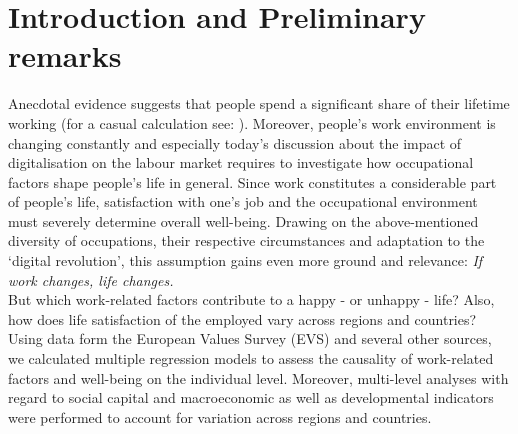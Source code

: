 \documentclass[preprint,12pt,authoryear]{elsarticle}
\begin{document}
\section{Introduction and Preliminary remarks}
Anecdotal evidence suggests that people spend a significant share of their lifetime working (for a casual calculation 
see: \citet{thompson_what_2016}). Moreover, people's work environment is changing constantly and especially today's 
discussion about the impact of digitalisation on the labour market requires to investigate how occupational factors shape 
people's life in general. Since work constitutes a considerable part of people’s life, satisfaction with one’s job and the
occupational environment must severely determine overall well-being. Drawing on the above-mentioned diversity of 
occupations, their respective circumstances and adaptation to the ‘digital revolution’, this assumption gains even more 
ground and relevance: \textit{If work changes, life changes.} \\
But which work-related factors contribute to a happy - or unhappy - life? Also, how does life satisfaction of the employed
vary across regions and countries? \\
Using data form the European Values Survey (EVS) and several other sources, we calculated multiple regression models to assess the causality of
work-related factors and well-being on the individual level. Moreover, multi-level analyses with regard to social capital and
macroeconomic as well as developmental indicators were performed to account for variation across regions and countries. 
\end{document}
